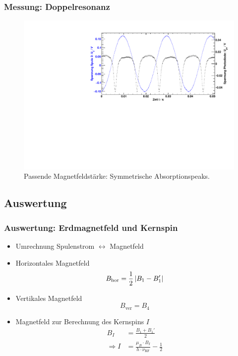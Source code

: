 \begin{frame}
\frametitle{Messung: Doppelresonanz}
\begin{figure}
    \begin{center}
        \includegraphics[width=\textwidth]{../img/08.pdf}
        \caption{Passende Magnetfeldstärke: Symmetrische Absorptionspeaks.}
        \label{img:rfcorrect}
    \end{center}
\end{figure}
\end{frame}



\subsection{Auswertung}
\begin{frame}
\frametitle{Auswertung: Erdmagnetfeld und Kernspin}
\begin{itemize}[<+->]
    \item Umrechnung Spulenstrom $\leftrightarrow$ Magnetfeld
    \item Horizontales Magnetfeld
    \begin{equation*}
        B_\text{hor} = \frac{1}{2} \left|B_1 - B_1'\right|
    \end{equation*}
    \item Vertikales Magnetfeld
    \begin{equation*}
        B_\text{ver} = B_4
    \end{equation*}
    \item Magnetfeld zur Berechnung des Kernspins $I$
    \begin{equation*}
        \begin{split}
            B_I &= \frac{B_1 + B_1'}{2} \\
            \Rightarrow I &= \frac{\mu_B \cdot B_I}{h \cdot \nu_\text{RF}} - \frac{1}{2}
        \end{split}
    \end{equation*}
\end{itemize}
\end{frame}


